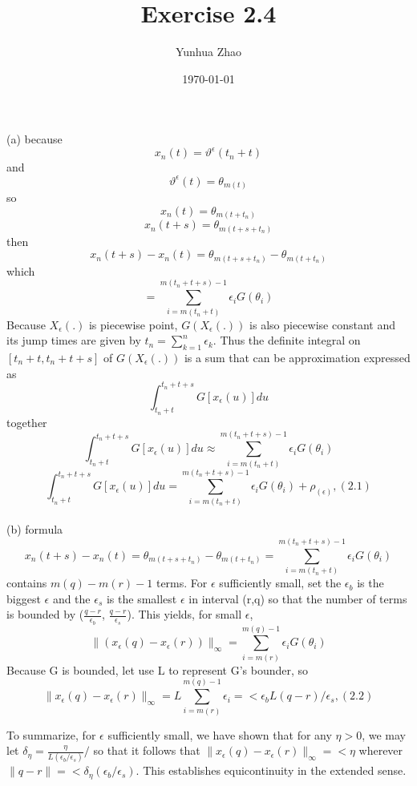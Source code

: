 \documentclass{article}
\title{Exercise 2.4}
\author{Yunhua Zhao}
\date{\today}
\begin{document}
\maketitle
(a) because $$x_{n}(t)=\vartheta^{\epsilon}(t_{n}+t)$$ and $$\vartheta^{\epsilon}(t)=\theta_{m(t)}$$ 
so $$x_{n}(t)=\theta_{m(t+t_n)}$$ 
   $$x_{n}(t+s)=\theta_{m(t+s+t_n)} $$
then $$x_{n}(t+s)-x_{n}(t)=\theta_{m(t+s+t_n)}-\theta_{m(t+t_n)}$$
which $$ =\sum_{i=m(t_n+t)}^{m(t_n+t+s)-1}\epsilon_iG(\theta_i) $$
Because $X_\epsilon(.)$ is piecewise point, $G(X_\epsilon(.))$ is also piecewise constant and its jump times are given by $t_n=\sum_{k=1}^{n}\epsilon_k$. Thus the definite integral on $[t_n+t, t_n+t+s]$ of $G(X_\epsilon(.))$ is a sum that can be approximation expressed as $$ \int_{t_n+t}^{t_n+t+s}G[x_\epsilon(u)]du $$ 
together  $$ \int_{t_n+t}^{t_n+t+s}G[x_\epsilon(u)]du  \approx \sum_{i=m(t_n+t)}^{m(t_n+t+s)-1}\epsilon_iG(\theta_i) $$ 
$$ \int_{t_n+t}^{t_n+t+s}G[x_\epsilon(u)]du=\sum_{i=m(t_n+t)}^{m(t_n+t+s)-1}\epsilon_iG(\theta_i)+\rho_(\epsilon),                    (2.1)$$ \\


(b) formula $$x_n(t+s)-x_n(t)=\theta_{m(t+s+t_n)}-\theta_{m(t+t_n)}=\sum_{i=m(t_n+t)}^{m(t_n+t+s)-1}\epsilon_iG(\theta_i) $$
contains $m(q)-m(r)-1$ terms. For $\epsilon$ sufficiently small, set the $\epsilon_b$ is the biggest $\epsilon$ and the $\epsilon_s$ is the smallest $\epsilon$ in interval (r,q) %
so that the number of terms is bounded by ($\frac{q-r}{\epsilon_b}$, $\frac{q-r}{\epsilon_s}$). This yields, for small $\epsilon$,
$$  \lVert(x_\epsilon(q)-x_\epsilon(r))\rVert_\infty = \sum_{i=m(r)}^{m(q)-1}\epsilon_iG(\theta_i) $$
Because G is bounded, let use L to represent G's bounder, so 
$$  \lVert x_\epsilon(q)-x_\epsilon(r) \rVert_\infty = L\sum_{i=m(r)}^{m(q)-1}\epsilon_i =<\epsilon_b L(q-r)/\epsilon_s,                               (2.2)$$

To summarize, for $\epsilon$ sufficiently small, we have shown that for any $\eta>0$, we may let $\delta_\eta=\frac{\eta}{L(\epsilon_b/\epsilon_s)}/$ so that it follows that $\lVert x_\epsilon(q)-x_\epsilon(r) \rVert_\infty =<\eta$ wherever $\lVert q-r \rVert =< \delta_\eta(\epsilon_b/\epsilon_s)$.  
This establishes equicontinuity in the extended sense.\\
\end{document}
